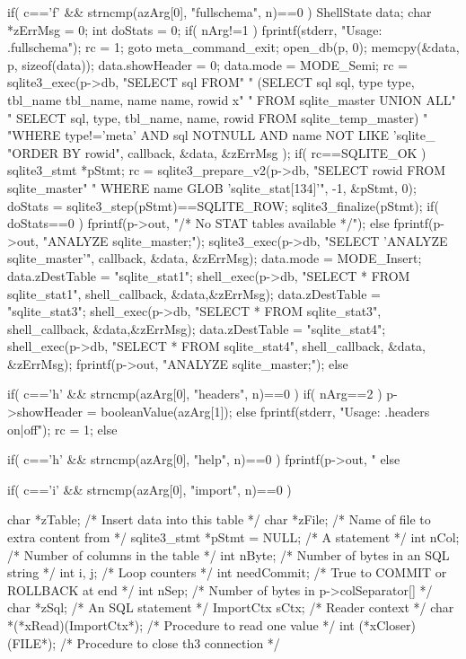 \begin{Codex}[label=shell.c,numbers=left]
{  if( c=='f' && strncmp(azArg[0], "fullschema", n)==0 ){
    ShellState data;
    char *zErrMsg = 0;
    int doStats = 0;
    if( nArg!=1 ){
      fprintf(stderr, "Usage: .fullschema\n");
      rc = 1;
      goto meta_command_exit;
    }
    open_db(p, 0);
    memcpy(&data, p, sizeof(data));
    data.showHeader = 0;
    data.mode = MODE_Semi;
    rc = sqlite3_exec(p->db,
       "SELECT sql FROM"
       "  (SELECT sql sql, type type, tbl_name tbl_name, name name, rowid x"
       "     FROM sqlite_master UNION ALL"
       "   SELECT sql, type, tbl_name, name, rowid FROM sqlite_temp_master) "
       "WHERE type!='meta' AND sql NOTNULL AND name NOT LIKE 'sqlite_%
       "ORDER BY rowid",
       callback, &data, &zErrMsg
    );
    if( rc==SQLITE_OK ){
      sqlite3_stmt *pStmt;
      rc = sqlite3_prepare_v2(p->db,
               "SELECT rowid FROM sqlite_master"
               " WHERE name GLOB 'sqlite_stat[134]'",
               -1, &pStmt, 0);
      doStats = sqlite3_step(pStmt)==SQLITE_ROW;
      sqlite3_finalize(pStmt);
    }
    if( doStats==0 ){
      fprintf(p->out, "/* No STAT tables available */\n");
    }else{
      fprintf(p->out, "ANALYZE sqlite_master;\n");
      sqlite3_exec(p->db, "SELECT 'ANALYZE sqlite_master'",
                   callback, &data, &zErrMsg);
      data.mode = MODE_Insert;
      data.zDestTable = "sqlite_stat1";
      shell_exec(p->db, "SELECT * FROM sqlite_stat1",
                 shell_callback, &data,&zErrMsg);
      data.zDestTable = "sqlite_stat3";
      shell_exec(p->db, "SELECT * FROM sqlite_stat3",
                 shell_callback, &data,&zErrMsg);
      data.zDestTable = "sqlite_stat4";
      shell_exec(p->db, "SELECT * FROM sqlite_stat4",
                 shell_callback, &data, &zErrMsg);
      fprintf(p->out, "ANALYZE sqlite_master;\n");
    }
  }else

  if( c=='h' && strncmp(azArg[0], "headers", n)==0 ){
    if( nArg==2 ){
      p->showHeader = booleanValue(azArg[1]);
    }else{
      fprintf(stderr, "Usage: .headers on|off\n");
      rc = 1;
    }
  }else

  if( c=='h' && strncmp(azArg[0], "help", n)==0 ){
    fprintf(p->out, "%
  }else

  if( c=='i' && strncmp(azArg[0], "import", n)==0 ){
    char *zTable;               /* Insert data into this table */
    char *zFile;                /* Name of file to extra content from */
    sqlite3_stmt *pStmt = NULL; /* A statement */
    int nCol;                   /* Number of columns in the table */
    int nByte;                  /* Number of bytes in an SQL string */
    int i, j;                   /* Loop counters */
    int needCommit;             /* True to COMMIT or ROLLBACK at end */
    int nSep;                   /* Number of bytes in p->colSeparator[] */
    char *zSql;                 /* An SQL statement */
    ImportCtx sCtx;             /* Reader context */
    char *(*xRead)(ImportCtx*); /* Procedure to read one value */
    int (*xCloser)(FILE*);      /* Procedure to close th3 connection */

}}
\end{Codex}
